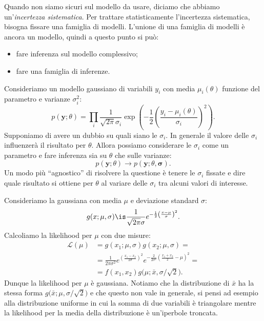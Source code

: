 

Quando non siamo sicuri sul modello da usare,
diciamo che abbiamo un'\emph{incertezza sistematica}.
Per trattare statisticamente l'incertezza sistematica,
bisogna fissare una famiglia di modelli.
L'unione di una famiglia di modelli è ancora un modello,
quindi a questo punto si può:
\begin{itemize}
	\item fare inferenza sul modello complessivo;
	\item fare una famiglia di inferenze.
\end{itemize}

\begin{example}
	Consideriamo un modello gaussiano di variabili $y_i$
	con media $\mu_i(\theta)$ funzione del parametro e varianze $\sigma_i^2$:
	\begin{equation*}
		p(\mathbf y;\theta)
		= \prod_i \frac1{\sqrt{2\pi}\sigma_i}
		\exp\left(-\frac12\left(\frac{y_i-\mu_i(\theta)}{\sigma_i}\right)^2\right).
	\end{equation*}
	Supponiamo di avere un dubbio su quali siano le $\sigma_i$.
	In generale il valore delle $\sigma_i$ influenzerà il risultato per $\theta$.
	Allora possiamo considerare le $\sigma_i$ come un parametro
	e fare inferenza sia su $\theta$ che sulle varianze:
	\begin{equation*}
		p(\mathbf y;\theta) \rightarrow p(\mathbf y;\theta,\boldsymbol\sigma).
	\end{equation*}
	Un modo più ``agnostico'' di risolvere la questione è tenere le $\sigma_i$ fissate
	e dire quale risultato si ottiene per $\theta$ al variare delle $\sigma_i$
	tra alcuni valori di interesse.
\end{example}


Consideriamo la gaussiana con media $\mu$ e deviazione standard $\sigma$:
\begin{equation*}
	g(x;\mu,\sigma) \is \frac1{\sqrt{2\pi}\sigma} e^{-\frac12 \left( \frac{x-\mu}\sigma \right)^2}.
\end{equation*}
Calcoliamo la likelihood per $\mu$ con due misure:
\begin{align*}
	\mathcal L(\mu)
	&= g(x_1;\mu,\sigma) g(x_2;\mu,\sigma) = \\
	&= \frac1{2\pi\sigma^2}
	e^{\left( \frac{x_1-x_2}{2\sigma} \right)^2}
	e^{-\frac2{2\sigma^2} \left( \frac{x_1+x_2}2 - \mu \right)^2} = \\
	&= f(x_1,x_2) g \big( \mu;\bar x,\sigma/\sqrt2 \big).
\end{align*}
Dunque la likelihood per $\mu$ è gaussiana.
Notiamo che la distribuzione di $\bar x$ ha la stessa forma $g \big( \bar x;\mu,\sigma/\sqrt2 \big)$
e che questo non vale in generale, si pensi ad esempio alla distribuzione uniforme
in cui la somma di due variabili è triangolare mentre la likelihood per la media della distribuzione è un'iperbole troncata.

